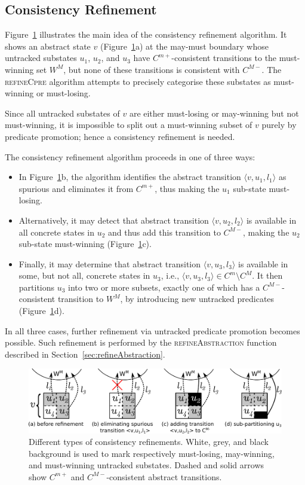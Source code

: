 \subsection{Consistency Refinement}
\label{sec:cons_refinement}

Figure~\ref{f:crefinement} illustrates the main idea of the consistency refinement algorithm.  It shows an abstract state $v$ (Figure~\ref{f:crefinement}a) at the may-must boundary whose untracked substates $u_1$, $u_2$, and $u_3$ have $C^{m+}$-consistent transitions to the must-winning set $W^M$, but none of these transitions is consistent with $C^{M-}$.  The \textsc{refineCpre} algorithm attempts to precisely categorise these substates as must-winning or must-losing.

Since all untracked substates of $v$ are either must-losing or may-winning but not must-winning, it is impossible to split out a must-winning subset of $v$ purely by predicate promotion; hence a consistency refinement is needed.

The consistency refinement algorithm proceeds in one of three ways:
\begin{itemize}
    \item In Figure~\ref{f:crefinement}b, the algorithm identifies the abstract transition $\langle v,u_1, l_1\rangle$ as spurious and eliminates it from $C^{m+}$, thus making the $u_1$ sub-state must-losing.  
    \item Alternatively, it may detect that abstract transition $\langle v, u_2, l_2\rangle$ is available in all concrete states in $u_2$ and thus add this transition to $C^{M-}$, making the $u_2$ sub-state must-winning (Figure~\ref{f:crefinement}c).  
    \item Finally, it may determine that abstract transition $\langle v, u_3, l_3\rangle$ is available in some, but not all, concrete states in $u_3$, i.e., $\langle v, u_3, l_3\rangle\in C^m\setminus C^M$.  It then partitions $u_3$ into two or more subsets, exactly one of which has a $C^{M-}$-consistent transition to $W^M$, by introducing new untracked predicates (Figure~\ref{f:crefinement}d).  
\end{itemize}

In all three cases, further refinement via untracked predicate promotion becomes possible.  Such refinement is performed by the \textsc{refineAbstraction} function described in Section~\ref{sec:refineAbstraction}.

\begin{figure}[t]
    \center
    \includegraphics[width=\linewidth]{imgs/crefinement}
    \caption{Different types of consistency refinements.  White, grey, and black background is used to mark respectively must-losing, may-winning, and must-winning untracked substates.  Dashed and solid arrows show $C^{m+}$ and $C^{M-}$-consistent abstract transitions.}
    \label{f:crefinement}
\end{figure}

